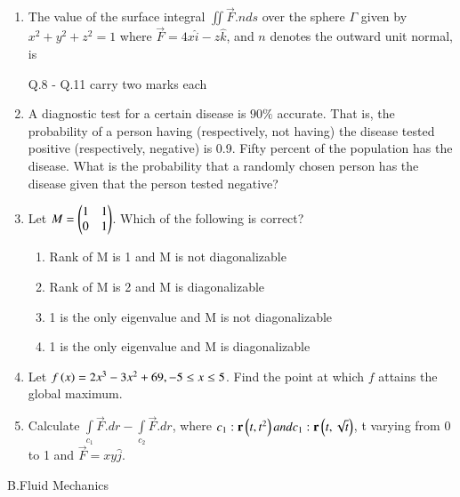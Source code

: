 \documentclass[journal]{IEEEtran}
\begin{document}
\begin{enumerate}[start=4]
\begin{enumerate}
\end{enumerate}
\item %
The value  of the surface integral $\iint \vec{F} . n ds$ over the sphere $\Gamma$ given by $x^2+y^2+z^2=1$ where $\vec{F}=4x\hat{i}-z\hat{k} $, and $n$ denotes the outward unit normal, is 
\begin{enumerate}
\end{enumerate}
Q.8 - Q.11 carry two marks each
\item %
A diagnostic test for a certain disease is $90 \%$ accurate. That is, the probability of a person having (respectively, not having) the disease tested positive (respectively,  negative) is 0.9. Fifty percent of the population has the disease. What is the probability that a randomly chosen person has the disease given that the person tested negative?
\item %
Let $M = \begin{pmatrix}
1 & 1 \\ 0 & 1  
\end{pmatrix} $. Which of the following is correct?
\begin{enumerate}
\item Rank of M is 1 and M is not diagonalizable
\item Rank of M is 2 and M is diagonalizable
\item 1 is the only eigenvalue and M is not diagonalizable
\item 1 is the only eigenvalue and M is diagonalizable
\end{enumerate}
\item %
Let $f\left(x\right)=2x^3-3x^2+69, -5\leq x \leq 5$. Find the point at which $f$ attains the global maximum.
\item %
Calculate $\int\limits_{c_{1}} \vec{F}.dr - \int\limits_{c_{2}}\vec{F}.dr$, where $c_1 : \mathbf{r}\left(t,t^2\right) and c_1 : \mathbf{r}\left(t,\sqrt{t}\right)$, t varying from 0 to 1 and $\vec{F}=xy\hat{j}$.
\end{enumerate}
\begin{center}
   B.Fluid Mechanics
\end{center}
\end{document}
